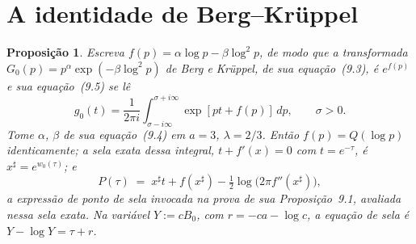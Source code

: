 \documentclass[11pt]{amsart}
\theoremstyle{plain}
\newtheorem{proposition}[theorem]{Proposição}
\theoremstyle{definition}
\theoremstyle{remark}
\begin{document}
\section{A identidade de Berg--Kr\"uppel}
\label{sec:bk}

\begin{proposition}
\label{prop:bkidentity}
Escreva $f(p) = \alpha\log p-\beta\log^2 p$, de modo que a transformada $G_0(p) =
p^\alpha\exp(-\beta\log^2 p)$ de Berg e Kr\"uppel, de sua equação~(9.3), é $e^{f(p)}$ e sua
equação~(9.5) se lê
\[
g_0(t) = \frac{1}{2\pi i}\int_{\sigma-i\infty}^{\sigma+i\infty}\exp[pt+f(p)]\,dp, \qquad \sigma>0.
\]
Tome $\alpha$, $\beta$ de sua equação~(9.4) em $a=3$, $\lambda=2/3$. Então $f(p) = Q(\log p)$
identicamente; a sela exata dessa integral, $t+f'(x)=0$ com $t = e^{-\tau}$, é $x^\sharp =
e^{w_0(\tau)}$; e
\[
P(\tau) \;=\; x^\sharp t + f(x^\sharp) - \tfrac12\log\bigl(2\pi f''(x^\sharp)\bigr),
\]
a expressão de ponto de sela invocada na prova de sua Proposição~9.1, avaliada nessa sela exata. Na
variável $Y := cB_0$, com $r = -ca-\log c$, a equação de sela é $Y-\log Y = \tau+r$.
\end{proposition}
\end{document}
